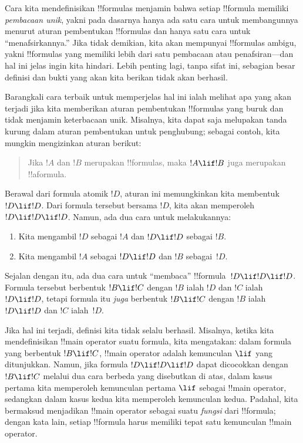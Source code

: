 \documentclass[../../../include/open-logic-section]{subfiles}
\begin{document}


\begin{explain}
Cara kita mendefinisikan !!{formula}s menjamin bahwa setiap !!{formula}
memiliki \emph{pembacaan unik}, yakni pada dasarnya hanya ada satu cara
untuk membangunnya menurut aturan pembentukan !!{formula}s dan hanya satu
cara untuk ``menafsirkannya.'' Jika tidak demikian, kita akan mempunyai
!!{formula}s ambigu, yakni !!{formula}s yang memiliki lebih dari satu
pembacaan atau penafsiran---dan hal ini jelas ingin kita hindari. Lebih
penting lagi, tanpa sifat ini, sebagian besar definisi dan bukti yang akan
kita berikan tidak akan berhasil.

Barangkali cara terbaik untuk memperjelas hal ini ialah melihat apa yang
akan terjadi jika kita memberikan aturan pembentukan !!{formula}s yang buruk
dan tidak menjamin keterbacaan unik. Misalnya, kita dapat saja melupakan
tanda kurung dalam aturan pembentukan untuk penghubung; sebagai contoh,
kita mungkin mengizinkan aturan berikut:
\begin{quote}
Jika $!A$ dan $!B$ merupakan !!{formula}s, maka $!A \lif !B$ juga
merupakan !!a{formula}.
\end{quote}
Berawal dari formula atomik $!D$, aturan ini memungkinkan kita membentuk
$!D \lif !D$. Dari formula tersebut bersama $!D$, kita akan memperoleh
$!D \lif !D \lif !D$. Namun, ada dua cara untuk melakukannya:
\begin{enumerate}
\item Kita mengambil $!D$ sebagai $!A$ dan $!D \lif !D$ sebagai $!B$.
\item Kita mengambil $!A$ sebagai $!D \lif !D$ dan $!B$ sebagai~$!D$.
\end{enumerate}
Sejalan dengan itu, ada dua cara untuk ``membaca'' !!{formula}~$!D \lif !D
\lif !D$. Formula tersebut berbentuk $!B \lif !C$ dengan $!B$ ialah $!D$
dan $!C$ ialah $!D \lif !D$, tetapi formula itu \emph{juga} berbentuk $!B
\lif !C$ dengan $!B$ ialah $!D \lif !D$ dan $!C$ ialah~$!D$.

Jika hal ini terjadi, definisi kita tidak selalu berhasil. Misalnya, ketika
kita mendefinisikan !!{main operator} suatu formula, kita mengatakan: dalam
formula yang berbentuk $!B \lif !C$, !!{main operator} adalah kemunculan
$\lif$ yang ditunjukkan. Namun, jika formula $!D \lif !D \lif !D$ dapat
dicocokkan dengan $!B \lif !C$ melalui dua cara berbeda yang disebutkan di
atas, dalam kasus pertama kita memperoleh kemunculan pertama $\lif$ sebagai
!!{main operator}, sedangkan dalam kasus kedua kita memperoleh kemunculan
kedua. Padahal, kita bermaksud menjadikan !!{main operator} sebagai suatu
\emph{fungsi} dari !!{formula}; dengan kata lain, setiap !!{formula} harus
memiliki tepat satu kemunculan !!{main operator}.
\end{explain}
\end{document}

